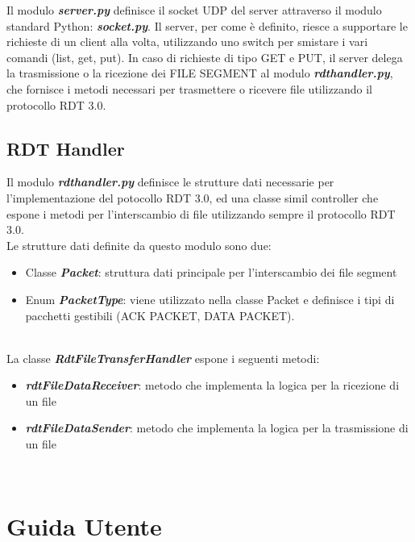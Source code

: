 \documentclass{article}
\begin{document}

Il modulo \textbf{\emph{server.py}} definisce il socket UDP del server attraverso il modulo standard Python: \textbf{\emph{socket.py}}.
Il server, per come è definito, riesce a supportare le richieste di un client alla volta, utilizzando uno switch per smistare i vari comandi (list, get, put).
In caso di richieste di tipo GET e PUT, il server delega la trasmissione o la ricezione dei FILE SEGMENT al modulo \textbf{\emph{rdt\textunderscore handler.py}},
che fornisce i metodi necessari per trasmettere o ricevere file utilizzando il protocollo RDT 3.0.

\subsection{RDT Handler}

Il modulo \textbf{\emph{rdt\textunderscore handler.py}} definisce le strutture dati necessarie per l'implementazione del potocollo RDT 3.0, ed una classe simil controller che espone i metodi per l'interscambio di file utilizzando sempre il protocollo RDT 3.0.\\
Le strutture dati definite da questo modulo sono due: 

	\begin{itemize}
			\item Classe \textbf{\emph{Packet}}: struttura dati principale per l'interscambio dei file segment
			\item Enum \textbf{\emph{PacketType}}: viene utilizzato nella classe Packet e definisce i tipi di pacchetti gestibili (ACK PACKET, DATA PACKET).
		\end{itemize}
	\ \\

La classe \textbf{\emph{RdtFileTransferHandler}} espone i seguenti metodi:

	\begin{itemize}
		\item \textbf{\emph{rdtFileDataReceiver}}: metodo che implementa la logica per la ricezione di un file
		\item \textbf{\emph{rdtFileDataSender}}: metodo che implementa la logica per la trasmissione di un file
	\end{itemize}
\ \\


\newpage
\section{Guida Utente}
\end{document}
